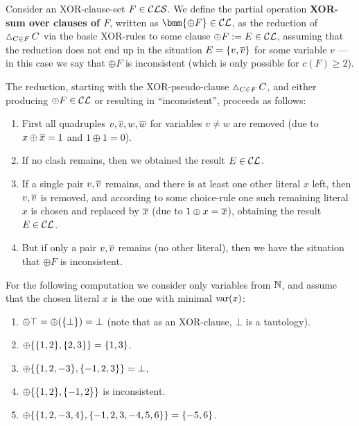 \documentclass[]{book}
\begin{document}
\begin{defi}\label{def:xorsum}
  \cite{h8} Consider an XOR-clause-set $F \in \mathcal{CLS}$. We define the partial operation \textbf{XOR-sum over clauses of $F$}, written 
  as $\bmm{\oplus F} \in \Cl$, as the reduction of $\operatorname{\vartriangle}_{C \in F} C$ via the basic XOR-rules to some clause $\oplus F := E \in \mathcal{CL}$, 
  assuming that the reduction does not end up in the situation $E = \{ v,\overline{v} \}$ for some variable $v$ --- in this case we say that 
  $\oplus F$ is inconsistent (which is only possible for $c(F) \ge 2$).

  The reduction, starting with the XOR-pseudo-clause $\operatorname{\vartriangle}_{C \in F} C$, and either producing $\oplus F \in \mathcal{CL}$ or resulting in 
  ``inconsistent'', proceeds as follows:
  \begin{enumerate}
  \item First all quadruples $v,\overline{v},w,\overline{w}$ for variables $v \ne w$ are removed (due to $x \oplus \overline{x} = 1$ and $1 \oplus 1 = 0$).
  \item If no clash remains, then we obtained the result $E \in \mathcal{CL}$.
  \item If a single pair $v, \overline{v}$ remains, and there is at least one other literal $x$ left, then $v, \overline{v}$ is removed, and 
  according to some choice-rule one such remaining literal $x$ is chosen and replaced by $\overline{x}$ (due to $1 \oplus x = \overline{x}$), 
  obtaining the result $E \in \mathcal{CL}$.
  \item But if only a pair $v, \overline{v}$ remains (no other literal), then we have the situation that $\oplus F$ is inconsistent.
  \end{enumerate}
\end{defi}

\begin{examp}\label{exp:xorcls2}
  \cite{h8} For the following computation we consider only variables from $\mathbb{N}$, and assume that the chosen literal $x$ is the 
  one with minimal $\operatorname{var}(x)$:
  \begin{enumerate}
  \item $\oplus \top = \oplus(\{ \bot \}) = \bot$ (note that as an XOR-clause, $\bot$ is a tautology).
  \item $\oplus \{ \{ 1,2 \},\{ 2,3 \} \} = \{ 1,3 \}$.
  \item $\oplus \{ \{ 1,2,-3 \},\{ -1,2,3 \} \} = \bot$.
  \item $\oplus \{ \{ 1,2 \},\{ -1,2 \} \}$ is inconsistent.
  \item $\oplus \{ \{ 1,2,-3,4 \},\{ -1,2,3,-4,5,6 \} \} = \{ -5,6 \}$.
  \end{enumerate}
\end{examp}
\end{document}
